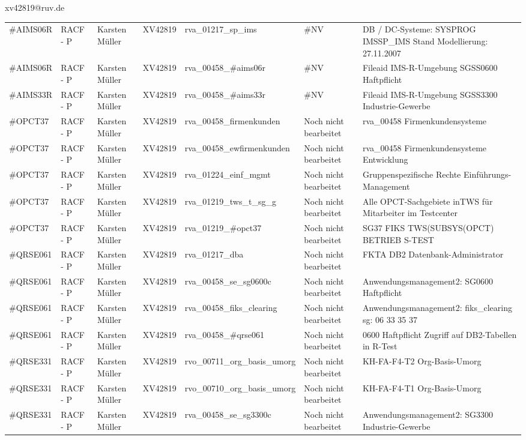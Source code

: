\documentclass[a4paper,landscape,12pt]{letter}
\begin{document}
\begin{letter}{xv42819@ruv.de\hfill \break}
\begin{tiny}
\begin{longtable}{|p{35mm}|p{15mm}|p{25mm}|p{10mm}|p{40mm}|p{50mm}|p{50mm}|}
\#AIMS06R & RACF - P & Karsten Müller & XV42819 & rva\_01217\_sp\_ims & \#NV & DB / DC-Systeme:  SYSPROG IMSSP\_IMS Stand Modellierung: 27.11.2007 \\
\#AIMS06R & RACF - P & Karsten Müller & XV42819 & rva\_00458\_\#aims06r & \#NV & Fileaid IMS-R-Umgebung SGSS0600 Haftpflicht \\
\#AIMS33R & RACF - P & Karsten Müller & XV42819 & rva\_00458\_\#aims33r & \#NV & Fileaid IMS-R-Umgebung SGSS3300 Industrie-Gewerbe \\
\#OPCT37 & RACF - P & Karsten Müller & XV42819 & rva\_00458\_firmenkunden & Noch nicht bearbeitet & rva\_00458 Firmenkundensysteme \\
\#OPCT37 & RACF - P & Karsten Müller & XV42819 & rva\_00458\_ewfirmenkunden & Noch nicht bearbeitet & rva\_00458 Firmenkundensysteme Entwicklung \\
\#OPCT37 & RACF - P & Karsten Müller & XV42819 & rva\_01224\_einf\_mgmt & Noch nicht bearbeitet & Gruppenspezifische Rechte Einführungs-Management \\
\#OPCT37 & RACF - P & Karsten Müller & XV42819 & rva\_01219\_tws\_t\_sg\_g & Noch nicht bearbeitet & Alle OPCT-Sachgebiete inTWS für Mitarbeiter im Testcenter \\
\#OPCT37 & RACF - P & Karsten Müller & XV42819 & rva\_01219\_\#opct37 & Noch nicht bearbeitet & SG37 FIKS TWS(SUBSYS(OPCT) BETRIEB S-TEST \\
\#QRSE061 & RACF - P & Karsten Müller & XV42819 & rva\_01217\_dba & Noch nicht bearbeitet & FKTA DB2 Datenbank-Administrator \\
\#QRSE061 & RACF - P & Karsten Müller & XV42819 & rva\_00458\_se\_sg0600c & Noch nicht bearbeitet & Anwendungsmanagement2: SG0600 Haftpflicht \\
\#QRSE061 & RACF - P & Karsten Müller & XV42819 & rva\_00458\_fiks\_clearing & Noch nicht bearbeitet & Anwendungsmanagement2: fiks\_clearing sg: 06 33 35 37 \\
\#QRSE061 & RACF - P & Karsten Müller & XV42819 & rva\_00458\_\#qrse061 & Noch nicht bearbeitet & 0600 Haftpflicht Zugriff auf DB2-Tabellen in R-Test \\
\#QRSE331 & RACF - P & Karsten Müller & XV42819 & rvo\_00711\_org\_basis\_umorg & Noch nicht bearbeitet & KH-FA-F4-T2 Org-Basis-Umorg \\
\#QRSE331 & RACF - P & Karsten Müller & XV42819 & rvo\_00710\_org\_basis\_umorg & Noch nicht bearbeitet & KH-FA-F4-T1 Org-Basis-Umorg \\
\#QRSE331 & RACF - P & Karsten Müller & XV42819 & rva\_00458\_se\_sg3300c & Noch nicht bearbeitet & Anwendungsmanagement2: SG3300 Industrie-Gewerbe \\

\end{longtable}
\end{tiny}
\end{letter}
\end{document}
